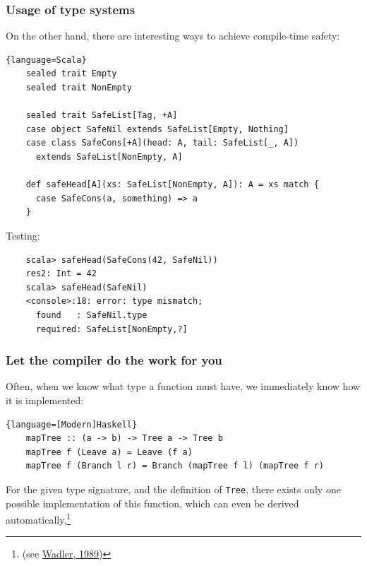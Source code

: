 \documentclass{beamer}
\begin{document}
\begin{frame}[containsverbatim]
  \frametitle{Usage of type systems} 

  On the other hand, there are interesting ways to achieve compile-time safety:

  \begin{lstlisting}{language=Scala}
    sealed trait Empty
    sealed trait NonEmpty

    sealed trait SafeList[Tag, +A]
    case object SafeNil extends SafeList[Empty, Nothing]
    case class SafeCons[+A](head: A, tail: SafeList[_, A]) 
      extends SafeList[NonEmpty, A]

    def safeHead[A](xs: SafeList[NonEmpty, A]): A = xs match {
      case SafeCons(a, something) => a
    }
  \end{lstlisting}

  Testing:

  \begin{lstlisting}
    scala> safeHead(SafeCons(42, SafeNil))
    res2: Int = 42
    scala> safeHead(SafeNil)
    <console>:18: error: type mismatch;
      found   : SafeNil.type
      required: SafeList[NonEmpty,?]
  \end{lstlisting}
  


\end{frame}

\begin{frame}[containsverbatim]
  \frametitle{Let the compiler do the work for you} 

  Often, when we know what type a function must have, we immediately know how it is implemented:


  \begin{lstlisting}{language=[Modern]Haskell}
    mapTree :: (a -> b) -> Tree a -> Tree b
    mapTree f (Leave a) = Leave (f a)
    mapTree f (Branch l r) = Branch (mapTree f l) (mapTree f r)
  \end{lstlisting}

  For the given type signature, and the definition of \texttt{Tree}, there exists only one possible
  implementation of this function, which can even be derived automatically.\footnote{(see 
    \href{http://doai.io/10.1145/99370.99404}{Wadler, 1989})}
\end{frame}
\end{document}
